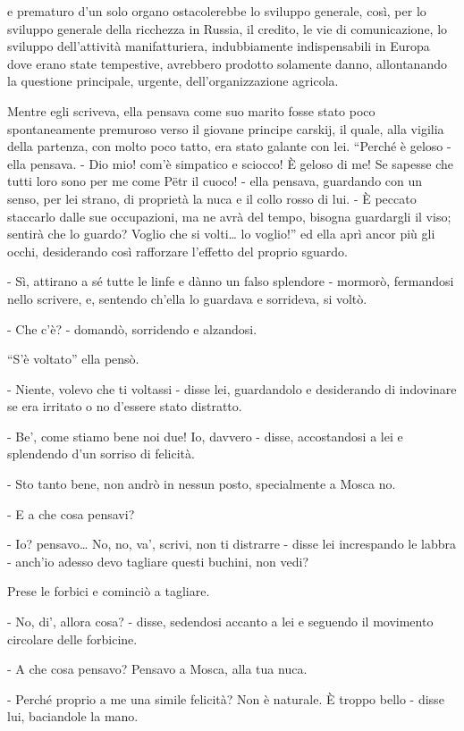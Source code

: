 e prematuro d'un solo organo ostacolerebbe lo sviluppo generale, così, per lo sviluppo generale della ricchezza in Russia, il credito, le vie di comunicazione, lo sviluppo dell'attività manifatturiera, indubbiamente indispensabili in Europa dove erano state tempestive, avrebbero prodotto solamente danno, allontanando la questione principale, urgente, dell'organizzazione agricola. 

Mentre egli scriveva, ella pensava come suo marito fosse stato poco spontaneamente premuroso verso il giovane principe carskij, il quale, alla vigilia della partenza, con molto poco tatto, era stato galante con lei. ``Perché è geloso - ella pensava. - Dio mio! com'è simpatico e sciocco! È geloso di me! Se sapesse che tutti loro sono per me come Pëtr il cuoco! - ella pensava, guardando con un senso, per lei strano, di proprietà la nuca e il collo rosso di lui. - È peccato staccarlo dalle sue occupazioni, ma ne avrà del tempo, bisogna guardargli il viso; sentirà che lo guardo? Voglio che si volti\ldots{} lo voglio!'' ed ella aprì ancor più gli occhi, desiderando così rafforzare l'effetto del proprio sguardo. 

- Sì, attirano a sé tutte le linfe e dànno un falso splendore - mormorò, fermandosi nello scrivere, e, sentendo ch'ella lo guardava e sorrideva, si voltò. 

- Che c'è? - domandò, sorridendo e alzandosi. 

``S'è voltato'' ella pensò. 

- Niente, volevo che ti voltassi - disse lei, guardandolo e desiderando di indovinare se era irritato o no d'essere stato distratto. 

- Be', come stiamo bene noi due! Io, davvero - disse, accostandosi a lei e splendendo d'un sorriso di felicità. 

- Sto tanto bene, non andrò in nessun posto, specialmente a Mosca no. 

- E a che cosa pensavi? 

- Io? pensavo\ldots{} No, no, va', scrivi, non ti distrarre - disse lei increspando le labbra - anch'io adesso devo tagliare questi buchini, non vedi? 

Prese le forbici e cominciò a tagliare. 

- No, di', allora cosa? - disse, sedendosi accanto a lei e seguendo il movimento circolare delle forbicine. 

- A che cosa pensavo? Pensavo a Mosca, alla tua nuca. 

- Perché proprio a me una simile felicità? Non è naturale. È troppo bello - disse lui, baciandole la mano. 

